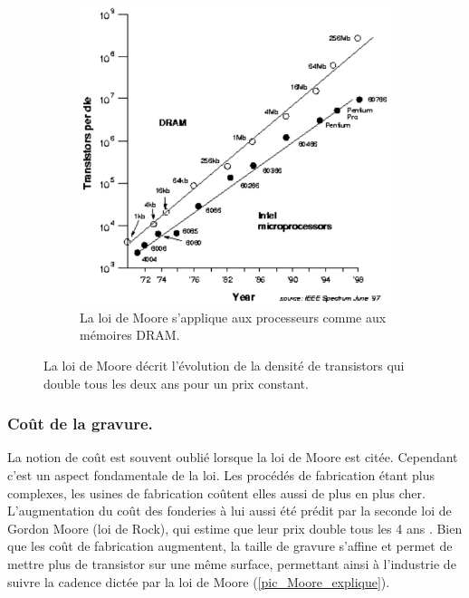 \begin{figure}
\begin{subfigure}[]{0.48\linewidth}
        \includegraphics[width=0.9\linewidth]{images/processeurs_porte_moore_dram.png}
        \caption{La loi de Moore s'applique aux processeurs comme aux mémoires DRAM.}
        \label{processeurs_porte_moore_dram}
    \end{subfigure}
    \caption{La loi de Moore décrit l'évolution de la densité de transistors qui double tous les deux ans pour un prix constant.}
    \label{fig_processeurs_moore}
\end{figure}





\subsubsection{Coût de la gravure.}

La notion de coût est souvent oublié lorsque la loi de Moore est citée. Cependant c'est un aspect fondamentale de la loi. Les procédés de fabrication étant plus complexes, les usines de fabrication coûtent elles aussi de plus en plus cher. L'augmentation du coût des fonderies à lui aussi été prédit par la seconde loi de Gordon Moore (loi de Rock), qui estime que leur prix double tous les 4 ans \cite{schaller1997moore}. Bien que les coût de fabrication augmentent, la taille de gravure s'affine et permet de mettre plus de transistor sur une même surface, permettant ainsi à l'industrie de suivre la cadence dictée par la loi de Moore (\autoref{pic_Moore_explique}).

